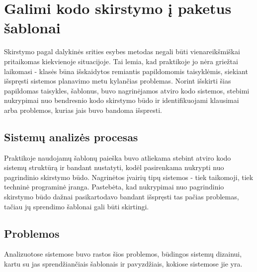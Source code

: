 \section{Galimi kodo skirstymo į paketus šablonai}
Skirstymo pagal dalykinės srities esybes metodas negali būti vienareikšmiškai pritaikomas kiekvienoje situacijoje.
Tai lemia, kad praktikoje jo nėra griežtai laikomasi - klasės būna išskaidytos remiantis papildomomis taisyklėmis,
siekiant išspręsti sistemos planavimo metu kylančias problemas.
Norint išskirti šias papildomas taisykles, šablonus, buvo nagrinėjamos atviro kodo sistemos,
stebimi nukrypimai nuo bendresnio kodo skirstymo būdo ir identifikuojami klausimai arba problemos, kurias jais buvo bandoma išspresti.

\subsection{Sistemų analizės procesas}
Praktikoje naudojamų šablonų paieška buvo atliekama stebint atviro kodo sistemų struktūrą ir bandant nustatyti, kodėl pasirenkama nukrypti
nuo pagrindinio skirstymo būdo. Nagrinėtos įvairių tipų sistemos - tiek taikomoji, tiek techninė programinė įranga.
Pastebėta, kad nukrypimai nuo pagrindinio skirstymo būdo dažnai pasikartodavo bandant išspręsti tas pačias problemas,
tačiau jų sprendimo šablonai gali būti skirtingi.

\subsection{Problemos}
Analizuotose sistemose buvo rastos šios problemos, būdingos sistemų dizainui, kartu su jas sprendžiančiais šablonais ir pavyzdžiais,
kokiose sistemose jie yra.

